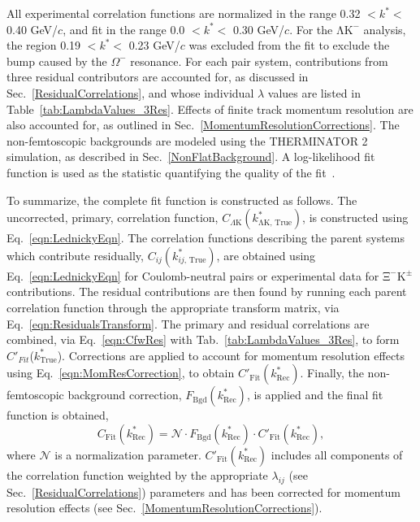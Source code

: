 \documentclass{svproc}
\newcommand{\ktrue}{$k^{*}_{\mathrm{True}}$\xspace}
\newcommand{\LamKchM}{$\mathrm{\Lambda}\mathrm{K^{-}}$\xspace}
\newcommand{\XiKpm}{$\mathrm{\Xi}^{-}\mathrm{K^{\pm}}$\xspace}
\begin{document}
All experimental correlation functions are normalized in the range 0.32 $< k^{*} <$ 0.40 GeV/$c$, and fit in the range 0.0 $< k^{*} <$ 0.30 GeV/$c$.
For the \LamKchM analysis, the region 0.19 $< k^{*} <$ 0.23 GeV/$c$ was excluded from the fit to exclude the bump caused by the $\Omega^{-}$ resonance.
For each pair system, contributions from three residual contributors are accounted for, as discussed in Sec.~\ref{ResidualCorrelations}, and whose individual $\lambda$ values are listed in Table~\ref{tab:LambdaValues_3Res}.
Effects of finite track momentum resolution are also accounted for, as outlined in Sec.~\ref{MomentumResolutionCorrections}.
The non-femtoscopic backgrounds are modeled using the THERMINATOR 2 simulation, as described in Sec.~\ref{NonFlatBackground}.
A log-likelihood fit function is used as the statistic quantifying the quality of the fit~\cite{Lisa:2005dd}.

To summarize, the complete fit function is constructed as follows.
The uncorrected, primary, correlation function, $C_{\Lambda\mathrm{K}}(k^{*}_{\mathrm{\Lambda K,\,True}})$, is constructed using Eq.~\ref{eqn:LednickyEqn}.
The correlation functions describing the parent systems which contribute residually, $C_{ij}(k^{*}_{ij,\,\mathrm{True}})$, are obtained using Eq.~\ref{eqn:LednickyEqn} for Coulomb-neutral pairs or experimental data for \XiKpm contributions.
The residual contributions are then found by running each parent correlation function through the appropriate transform matrix, via Eq.~\ref{eqn:ResidualsTransform}.
The primary and residual correlations are combined, via Eq.~\ref{eqn:CfwRes} with Tab.~\ref{tab:LambdaValues_3Res}, to form $C'_{Fit}$(\ktrue).
Corrections are applied to account for momentum resolution effects using Eq.~\ref{eqn:MomResCorrection}, to obtain $C'_{\mathrm{Fit}}(k^{*}_{\mathrm{Rec}})$.
Finally, the non-femtoscopic background correction, $F_{\mathrm{Bgd}}(k^{*}_{\mathrm{Rec}})$, is applied and the final fit function is obtained,
\begin{equation}
C_{\mathrm{Fit}}(k^{*}_{\mathrm{Rec}}) = \mathcal{N}\cdot F_{\mathrm{Bgd}}(k^{*}_{\mathrm{Rec}})\cdot C'_{\mathrm{Fit}}(k^{*}_{\mathrm{Rec}}),
\end{equation}
where $\mathcal{N}$ is a normalization parameter.
$C'_{\mathrm{Fit}}(k^{*}_{\mathrm{Rec}})$ includes all components of the correlation function weighted by the appropriate $\lambda_{ij}$ (see Sec.~\ref{ResidualCorrelations}) parameters and has been corrected for momentum resolution effects (see Sec.~\ref{MomentumResolutionCorrections}).
\end{document}
